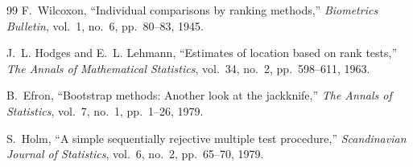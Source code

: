 \documentclass[12pt,a4paper,oneside]{report}
\begin{document}
{\begin{thebibliography}{99}
F.~Wilcoxon, ``Individual comparisons by ranking methods,'' \emph{Biometrics
Bulletin}, vol.~1, no.~6, pp.~80--83, 1945.

J.~L. Hodges and E.~L. Lehmann, ``Estimates of location based on rank tests,''
\emph{The Annals of Mathematical Statistics}, vol.~34, no.~2, pp.~598--611,
1963.

B.~Efron, ``Bootstrap methods: Another look at the jackknife,'' \emph{The
Annals of Statistics}, vol.~7, no.~1, pp.~1--26, 1979.

S.~Holm, ``A simple sequentially rejective multiple test procedure,''
\emph{Scandinavian Journal of Statistics}, vol.~6, no.~2, pp.~65--70, 1979.

\end{thebibliography}
}
\end{document}
